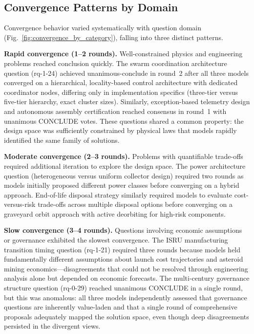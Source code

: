 \documentclass[11pt,a4paper]{article}
\begin{document}
\subsection{Convergence Patterns by Domain}

Convergence behavior varied systematically with question domain (Fig.~\ref{fig:convergence_by_category}), falling into three distinct patterns.

\textbf{Rapid convergence (1--2 rounds).} Well-constrained physics and engineering problems reached conclusion quickly. The swarm coordination architecture question (rq-1-24) achieved unanimous-conclude in round~2 after all three models converged on a hierarchical, locality-based control architecture with dedicated coordinator nodes, differing only in implementation specifics (three-tier versus five-tier hierarchy, exact cluster sizes). Similarly, exception-based telemetry design and autonomous assembly certification reached consensus in round~1 with unanimous CONCLUDE votes. These questions shared a common property: the design space was sufficiently constrained by physical laws that models rapidly identified the same family of solutions.

\textbf{Moderate convergence (2--3 rounds).} Problems with quantifiable trade-offs required additional iteration to explore the design space. The power architecture question (heterogeneous versus uniform collector design) required two rounds as models initially proposed different power classes before converging on a hybrid approach. End-of-life disposal strategy similarly required models to evaluate cost-versus-risk trade-offs across multiple disposal options before converging on a graveyard orbit approach with active deorbiting for high-risk components.

\textbf{Slow convergence (3--4 rounds).} Questions involving economic assumptions or governance exhibited the slowest convergence. The ISRU manufacturing transition timing question (rq-1-21) required three rounds because models held fundamentally different assumptions about launch cost trajectories and asteroid mining economics---disagreements that could not be resolved through engineering analysis alone but depended on economic forecasts. The multi-century governance structure question (rq-0-29) reached unanimous CONCLUDE in a single round, but this was anomalous: all three models independently assessed that governance questions are inherently value-laden and that a single round of comprehensive proposals adequately mapped the solution space, even though deep disagreements persisted in the divergent views.
\end{document}
